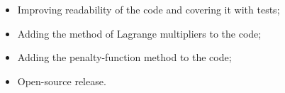 \begin{itemize}
\item Improving readability of the code and covering it with tests;
\item Adding the method of Lagrange multipliers to the code;
\item Adding the penalty-function method to the code;
\item Open-source release.
\end{itemize}
